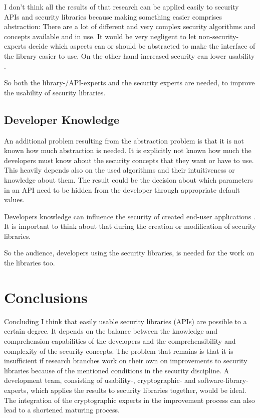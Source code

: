 \documentclass{sig-alternate-05-2015}
\begin{document}
I don't think all the results of that research can be applied easily to security APIs and security libraries because making something easier comprises abstraction: There are a lot of different and very complex security algorithms and concepts available and in use. It would be very negligent to let non-security-experts decide which aspects can or should be abstracted to make the interface of the library easier to use. On the other hand increased security can lower usability \cite{Myers:2016:IAU:2896587}.

So both the library-/API-experts and the security experts are needed, to improve the usability of security libraries.

\subsection{Developer Knowledge}
An additional problem resulting from the abstraction problem is that it is not known how much abstraction is needed. 
It is explicitly not known how much the developers must know about the security concepts that they want or have to use. This heavily depends also on the used algorithms and their intuitiveness or knowledge about them.
The result could be the decision about which parameters in an API need to be hidden from the developer through appropriate default values.

Developers knowledge can influence the security of created end-user applications \cite{Fahl:2013:RSD:2508859.2516655}. It is important to think about that during the creation or modification of security libraries.

So the audience, developers using the security libraries, is needed for the work on the libraries too.


\section{Conclusions}
Concluding I think that easily usable security libraries (APIs) are possible to a certain degree. It depends on the balance between the knowledge and comprehension capabilities of the developers and the comprehensibility and complexity of the security concepts. The problem that remains is that it is insufficient if research branches work on their own on improvements to security libraries because of the mentioned conditions in the security discipline.
A development team, consisting of usability-, cryptographic- and software-library-experts, which applies the results to security libraries together, would be ideal. The integration of the cryptographic experts in the improvement process can also lead to a shortened maturing process.



  
\end{document}
